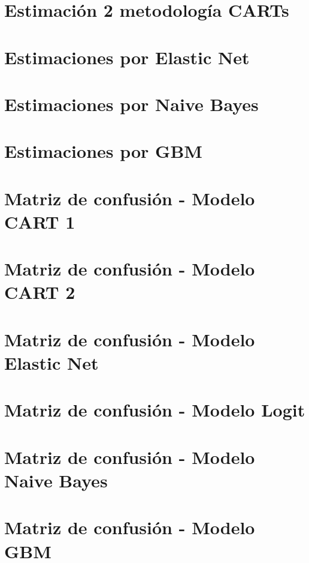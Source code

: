 \documentclass[12pt,a4paper,onecolumn]{article}
\begin{document}
\section{Estimación 2 metodología CARTs}


\section{Estimaciones por Elastic Net}


\section{Estimaciones por Naive Bayes}


\section{Estimaciones por GBM}


\section{Matriz de confusión - Modelo CART 1}


\section{Matriz de confusión - Modelo CART 2}


\section{Matriz de confusión - Modelo Elastic Net}


\section{Matriz de confusión - Modelo Logit}


\section{Matriz de confusión - Modelo Naive Bayes}


\section{Matriz de confusión - Modelo GBM}



\pagebreak
\singlespacing
\nocite{*}


\end{document}
